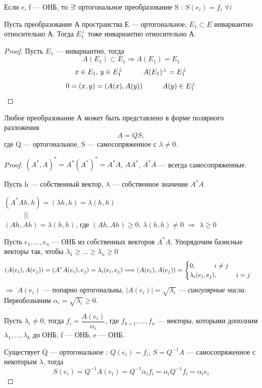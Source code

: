 \begin{theorem}
    Если e, f --- ОНБ, то $\exists$! ортогональное преобразование S : $S(e_i) = f_i$ $\forall i$
\end{theorem}

\begin{theorem}
    Пусть преобразование А пространства Е --- ортогональное, $E_1 \subset E$ инвариантно относительно А. Тогда $E_1^{\perp}$ тоже инвариантно относительно А.
\end{theorem}
\begin{proof}
    Пусть $E_1$ --- инвариантно, тогда
    \[
    A(E_1) \subset E_1 \Longrightarrow A(E_1) = E_1
    \]
    \[
    x \in E_1,\thinspace y \in E_1^{\perp} \hspace*{1cm} A(E_1)^{\perp} = E_1^{\perp}
    \]
    \[
    0 = (x, y) = (A(x), A(y)) \hspace*{1cm} A(y) \in E_1^{\perp}
    \]
\end{proof}

\begin{theorem}
    Любое преобразование А может быть представлено в форме полярного разложения
    \[
    A = QS,
    \]
    где Q --- ортогональное, S --- самосопряженное с $\lambda \neq 0$.
\end{theorem}
\begin{proof}
    $(A^*, A)^* = A^*(A^*)^* = A^*A$, $AA^*$, $A^*A$ --- всегда самосопряженные.

    Пусть h --- собственный вектор, $\lambda$ --- собственное значение $A^*A$

    $(A^*Ah, h) = (\lambda h, h) = \lambda(h, h)$\\
    $\hspace*{1cm} ||$\\
    $(Ah, Ah) = \lambda(h, h)$, где $(Ah, Ah) \geq 0$, $\lambda(h, h) \neq 0$ $\Longrightarrow$ $\lambda \geq 0$

    Пусть $e_1, ..., e_n$ --- ОНБ из собственных векторов $A^*A$. Упорядочим базисные векторы так, чтобы $\lambda_1 \geq ... \geq \lambda_n \geq 0$
    \[
    (A(e_i), A(e_j)) = (A^*A(e_i), e_j) = \lambda_i(e_i, e_j) \Longrightarrow (A(e_i), A(e_j)) = \begin{cases}
        0, \hspace*{1cm} i \neq j\\
        \lambda_i(e_i, e_j), \hspace*{1cm} i = j
    \end{cases}
    \]
    $\Longrightarrow$ $A(e_i)$ --- попарно ортогональны, $|A(e_i)| = \sqrt{\lambda_i}$ --- \textit{сингулярные числа}. Переобозначим $\alpha_i = \sqrt{\lambda_i} \geq 0$.

    Пусть $\lambda_i \neq 0$, тогда $f_i = \dfrac{A(e_i)}{\alpha_i}$, где $f_{k + 1}, ..., f_n$ --- векторы, которыми дополним $\lambda_1, ..., \lambda_k$ до ОНБ, f --- ОНБ, e --- ОНБ.

    Существует Q --- ортогональное : $Q(e_i) = f_i$, $S = Q^{-1}A$ --- самосопряженное с некоторым $\lambda$, тогда
    \[
    S(e_i) = Q^{-1}A(e_i) = Q^{-1}\alpha_i f_i = \alpha_i Q^{-1} f_i = \alpha_i e_i
    \]
\end{proof}

